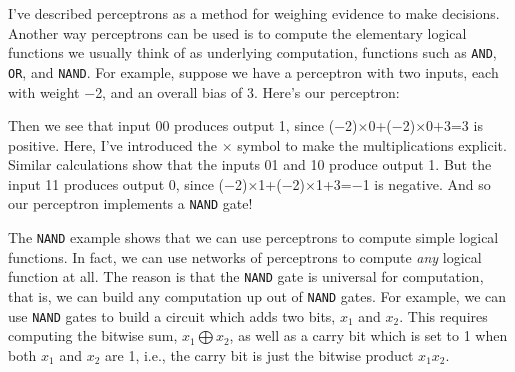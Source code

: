 I've described perceptrons as a method for weighing evidence to make decisions. Another way perceptrons can be used is to compute the elementary logical functions we usually think of as underlying computation, functions such as \lstinline{AND}, \lstinline{OR}, and \lstinline{NAND}. For example, suppose we have a perceptron with two inputs, each with weight $-$2, and an overall bias of 3. Here's our perceptron: 


\begin{marginfigure}
\end{marginfigure}


Then we see that input 00 produces output 1, since ($-$2)$\times$0+($-$2)$\times$0$+$3=3 is positive. Here, I've introduced the $\times$ symbol to make the multiplications explicit. Similar calculations show that the inputs 01 and 10 produce output 1. But the input 11 produces output 0, since ($-$2)$\times$1+($-$2)$\times$1+3=$-$1 is negative. And so our perceptron implements a \lstinline{NAND} gate!

The \lstinline{NAND} example shows that we can use perceptrons to compute simple logical functions. In fact, we can use networks of perceptrons to compute \textit{any} logical function at all. The reason is that the \lstinline{NAND} gate is universal for computation, that is, we can build any computation up out of \lstinline{NAND} gates. For example, we can use \lstinline{NAND} gates to build a circuit which adds two bits, $x_1$ and $x_2$. This requires computing the bitwise sum, $x_1\bigoplus x_2$, as well as a carry bit which is set to 1 when both $x_1$ and $x_2$ are 1, i.e., the carry bit is just the bitwise product $x_1 x_2$.


